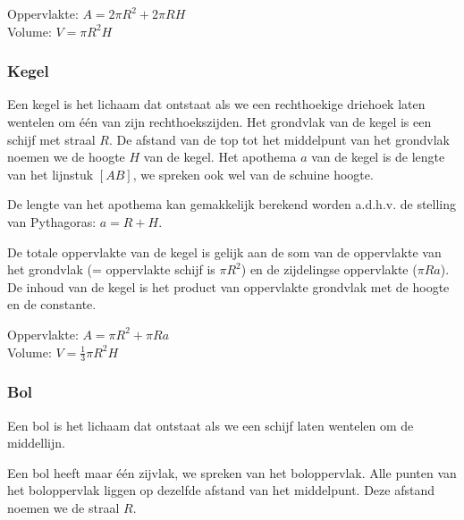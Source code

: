 
\begin{ftonthoud}
	
		Oppervlakte: $A=2\pi R^2 + 2\pi RH$
		\\
		Volume: $V=\pi R^2 H$
\end{ftonthoud}

\subsubsection{Kegel}
\begin{definitie}
	Een kegel is het lichaam dat ontstaat als we een rechthoekige driehoek laten wentelen om \'e\'en van zijn rechthoekszijden. Het grondvlak van de kegel is een schijf met straal $R$. De afstand van de top tot het middelpunt van het grondvlak noemen we de hoogte $H$ van de kegel. Het apothema $a$ van de kegel is de lengte van het lijnstuk $[AB]$, we spreken ook wel van de schuine hoogte.
\end{definitie}
De lengte van het apothema kan gemakkelijk berekend worden a.d.h.v. de stelling van Pythagoras: $a=R+H$.

De totale oppervlakte van de kegel is gelijk aan de som van de oppervlakte van het grondvlak (= oppervlakte schijf is $\pi R^2$) en de zijdelingse oppervlakte ($\pi R a$). De inhoud van de kegel is het product van oppervlakte grondvlak met de hoogte en de constante.




		
\begin{ftonthoud}
			Oppervlakte: $A=\pi R^2 + \pi R a$ 
		\\
		Volume: $V=\frac{1}{3}\pi R^2 H$
\end{ftonthoud}

\subsubsection{Bol}
\begin{definitie}
	Een bol is het lichaam dat ontstaat als we een schijf laten wentelen om de middellijn.
\end{definitie} Een bol heeft maar \'e\'en zijvlak, we spreken van het boloppervlak. 
Alle punten van het boloppervlak liggen op dezelfde afstand van het middelpunt. Deze afstand noemen we de straal $R$.

